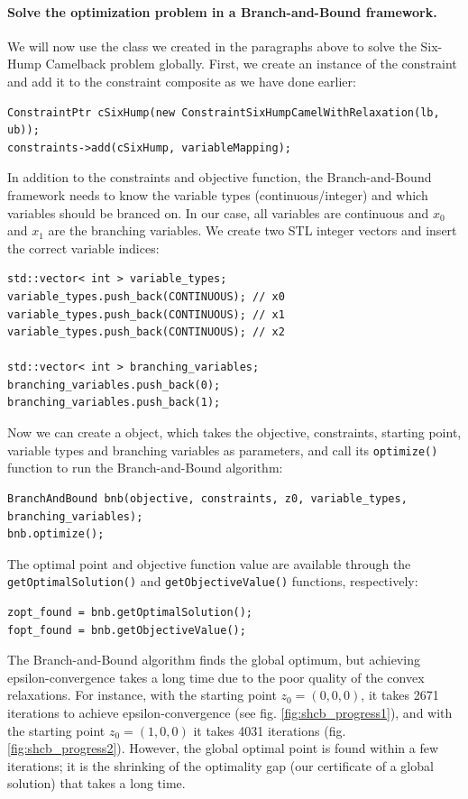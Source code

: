 \paragraph{Solve the optimization problem in a Branch-and-Bound framework.} We will now use the  class we created in the paragraphs above to solve the Six-Hump Camelback problem globally. First, we create an instance of the constraint and add it to the constraint composite as we have done earlier:
\begin{lstlisting}
ConstraintPtr cSixHump(new ConstraintSixHumpCamelWithRelaxation(lb, ub));
constraints->add(cSixHump, variableMapping);
\end{lstlisting}
In addition to the constraints and objective function, the Branch-and-Bound framework needs to know the variable types (continuous/integer) and which variables should be branced on. In our case, all variables are continuous and $x_0$ and $x_1$ are the branching variables. We create two STL integer vectors and insert the correct variable indices:
\begin{lstlisting}
std::vector< int > variable_types;
variable_types.push_back(CONTINUOUS); // x0
variable_types.push_back(CONTINUOUS); // x1
variable_types.push_back(CONTINUOUS); // x2

std::vector< int > branching_variables;
branching_variables.push_back(0);
branching_variables.push_back(1);
\end{lstlisting}
Now we can create a  object, which takes the objective, constraints, starting point, variable types and branching variables as parameters, and call its \texttt{optimize()} function to run the Branch-and-Bound algorithm:
\begin{lstlisting}
BranchAndBound bnb(objective, constraints, z0, variable_types, branching_variables);
bnb.optimize();    
\end{lstlisting}
The optimal point and objective function value are available through the \texttt{getOptimalSolution()} and \texttt{getObjectiveValue()} functions, respectively:
\begin{lstlisting}
zopt_found = bnb.getOptimalSolution();
fopt_found = bnb.getObjectiveValue();
\end{lstlisting}
The Branch-and-Bound algorithm finds the global optimum, but achieving epsilon-convergence takes a long time due to the poor quality of the convex relaxations. For instance, with the starting point $z_0 = (0, 0, 0)$, it takes 2671 iterations to achieve epsilon-convergence (see fig. \ref{fig:shcb_progress1}), and with the starting point $z_0 = (1,0,0)$ it takes 4031 iterations (fig. \ref{fig:shcb_progress2}). However, the global optimal point is found  within a few iterations; it is the shrinking of the optimality gap (our certificate of a global solution) that takes a long time.
